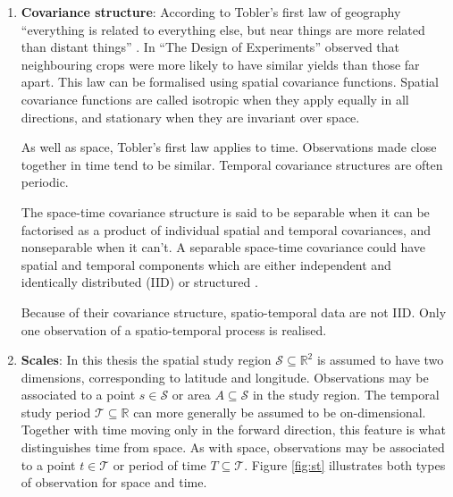 \documentclass[a4paper, nobind]{templates/ociamthesis}
\begin{document}
\begin{enumerate}
\def\labelenumi{\arabic{enumi}.}
\item
  \textbf{Covariance structure}:
  According to Tobler's first law of geography ``everything is related to everything else, but near things are more related than distant things'' \autocite{tobler1970computer}.
  In ``The Design of Experiments'' \textcite{fisher1936design} observed that neighbouring crops were more likely to have similar yields than those far apart.
  This law can be formalised using spatial covariance functions.
  Spatial covariance functions are called isotropic when they apply equally in all directions, and stationary when they are invariant over space.

  As well as space, Tobler's first law applies to time.
  Observations made close together in time tend to be similar.
  Temporal covariance structures are often periodic.

  The space-time covariance structure \autocite{porcu202130} is said to be separable when it can be factorised as a product of individual spatial and temporal covariances, and nonseparable when it can't.
  A separable space-time covariance could have spatial and temporal components which are either independent and identically distributed (IID) or structured \autocite{knorr2000bayesian}.

  Because of their covariance structure, spatio-temporal data are not IID.
  Only one observation of a spatio-temporal process is realised.
\item
  \textbf{Scales}:
  In this thesis the spatial study region \(\mathcal{S} \subseteq \mathbb{R}^2\) is assumed to have two dimensions, corresponding to latitude and longitude.
  Observations may be associated to a point \(s \in \mathcal{S}\) or area \(A \subseteq \mathcal{S}\) in the study region.
  The temporal study period \(\mathcal{T} \subseteq \mathbb{R}\) can more generally be assumed to be on-dimensional.
  Together with time moving only in the forward direction, this feature is what distinguishes time from space.
  As with space, observations may be associated to a point \(t \in \mathcal{T}\) or period of time \(T \subseteq \mathcal{T}\).
  Figure \ref{fig:st} illustrates both types of observation for space and time.


\end{enumerate}
\end{document}
